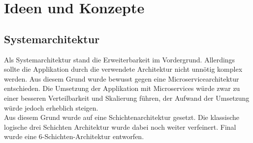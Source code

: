 \section{Ideen und Konzepte}
\subsection{Systemarchitektur}
Als Systemarchitektur stand die Erweiterbarkeit im Vordergrund. Allerdings sollte die Applikation durch die verwendete Architektur nicht unnötig komplex werden. Aus diesem Grund wurde bewusst gegen eine Microservicearchitektur entschieden. Die Umsetzung der Applikation mit Microservices würde zwar zu einer besseren Verteilbarkeit und Skalierung führen, der Aufwand der Umsetzung würde jedoch erheblich steigen. \\
Aus diesem Grund wurde auf eine Schichtenarchitektur gesetzt. Die klassische logische drei Schichten Architektur wurde dabei noch weiter verfeinert. Final wurde eine 6-Schichten-Architektur entworfen. 
\newpage